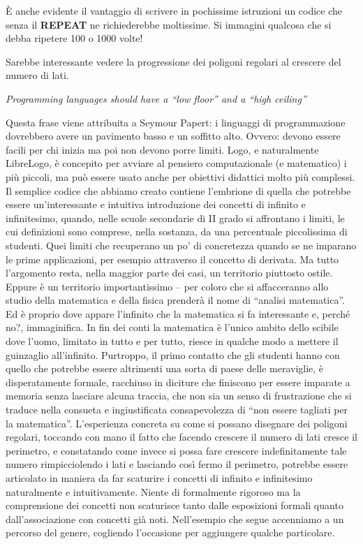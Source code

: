 \vskip 1cm

È anche evidente il vantaggio di scrivere in pochissime istruzioni un codice che senza il \textbf{REPEAT} ne richiederebbe moltissime. Si immagini qualcosa che si debba ripetere 100 o 1000 volte! 

Sarebbe interessante vedere la progressione dei poligoni regolari al crescere del numero di lati. 

\begin{centering}
\textit{Programming languages should have a “low floor” and a “high ceiling”}
\end{centering}

Questa frase viene attribuita a Seymour Papert: i linguaggi di programmazione dovrebbero avere un pavimento basso e un soffitto alto. Ovvero: devono essere facili per chi inizia ma poi non devono porre limiti. Logo, e naturalmente LibreLogo, è concepito per avviare al pensiero computazionale (e matematico) i più piccoli, ma può essere usato anche per obiettivi didattici molto più complessi. Il semplice codice che abbiamo creato contiene l'embrione di quella che potrebbe essere un'interessante e intuitiva introduzione dei concetti di infinito e infinitesimo, quando, nelle scuole secondarie di II grado si affrontano i limiti, le cui definizioni sono comprese, nella sostanza, da una percentuale piccolissima di studenti. Quei limiti che recuperano un po' di concretezza quando se ne imparano le prime applicazioni, per esempio attraverso il concetto di derivata. Ma tutto l'argomento resta, nella maggior parte dei casi, un territorio piuttosto ostile. Eppure è un territorio importantissimo – per coloro che si affacceranno allo studio della matematica e della fisica prenderà il nome di “analisi matematica”.  Ed è proprio dove appare l'infinito che la matematica si fa interessante e, perché no?, immaginifica. In fin dei conti la matematica è l'unico ambito dello scibile dove l'uomo, limitato in tutto e per tutto, riesce in qualche modo a mettere il guinzaglio all'infinito. Purtroppo, il primo contatto che gli studenti hanno con quello che potrebbe essere altrimenti una sorta di paese delle meraviglie, è disperatamente formale, racchiuso in diciture che finiscono per essere imparate a memoria senza lasciare alcuna traccia, che non sia un senso di frustrazione che si traduce nella consueta e ingiustificata consapevolezza di “non essere tagliati per la matematica”. L'esperienza concreta su come si possano disegnare dei poligoni regolari, toccando con mano il fatto che facendo crescere il numero di lati cresce il  perimetro, e constatando come invece si possa fare crescere indefinitamente tale numero rimpicciolendo i lati e lasciando così fermo il perimetro, potrebbe essere articolato in maniera da far scaturire i concetti di infinito e infinitesimo naturalmente e intuitivamente. Niente di formalmente rigoroso ma la comprensione dei concetti non scaturisce tanto dalle esposizioni formali quanto dall'associazione con concetti già noti. Nell'esempio che segue accenniamo a un percorso del genere, cogliendo l'occasione per aggiungere qualche particolare.

